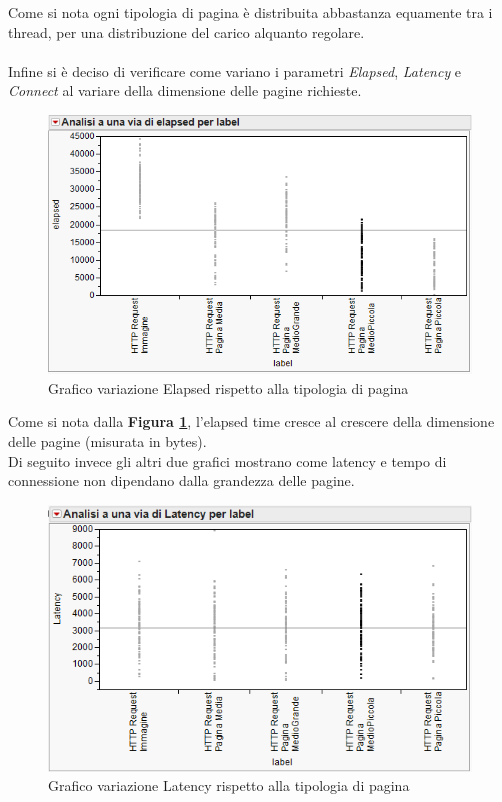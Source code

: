 		
		Come si nota ogni tipologia di pagina è distribuita abbastanza equamente tra i thread, per una distribuzione del carico alquanto regolare.\\\\
		Infine si è deciso di verificare come variano i parametri \textit{Elapsed}, \textit{Latency} e \textit{Connect} al variare della dimensione delle pagine richieste.
		
		\begin{figure}[H]
			\centering
			\includegraphics[scale=0.85]{./immagine/grafico_elapsed.png}
			\caption{Grafico variazione Elapsed rispetto alla tipologia di pagina}
			\label{fig:grafico_elapsed}
		\end{figure}
		
		Come si nota dalla \textbf{Figura \ref{fig:grafico_elapsed}}, l'elapsed time cresce al crescere della dimensione delle pagine (misurata in bytes).\\
		Di seguito invece gli altri due grafici mostrano come latency e tempo di connessione non dipendano dalla grandezza delle pagine.
		
		\begin{figure}[H]
			\centering
			\includegraphics[scale=0.85]{./immagine/grafico_latency.png}
			\caption{Grafico variazione Latency rispetto alla tipologia di pagina}
			\label{fig:grafico_latency}
		\end{figure}
		
